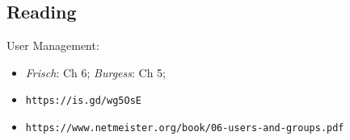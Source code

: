 \documentclass[xga]{xdvislides}
\begin{document}
%

\subsection{Reading}
User Management:
\begin{itemize}
	\item {\em Frisch}: Ch 6; {\em Burgess}: Ch 5;
\end{itemize}
\vspace{.5in}
\begin{itemize}
	\item {\tt https://is.gd/wg5OsE}
	\item {\tt https://www.netmeister.org/book/06-users-and-groups.pdf}
\end{itemize}

%
%
\end{document}
